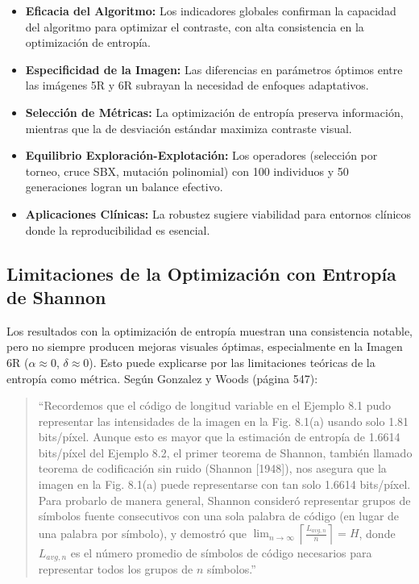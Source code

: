 \begin{itemize}
    \item \textbf{Eficacia del Algoritmo:} Los indicadores globales confirman la capacidad del algoritmo para optimizar el contraste, con alta consistencia en la optimización de entropía.
    \item \textbf{Especificidad de la Imagen:} Las diferencias en parámetros óptimos entre las imágenes 5R y 6R subrayan la necesidad de enfoques adaptativos.
    \item \textbf{Selección de Métricas:} La optimización de entropía preserva información, mientras que la de desviación estándar maximiza contraste visual.
    \item \textbf{Equilibrio Exploración-Explotación:} Los operadores (selección por torneo, cruce SBX, mutación polinomial) con 100 individuos y 50 generaciones logran un balance efectivo.
    \item \textbf{Aplicaciones Clínicas:} La robustez sugiere viabilidad para entornos clínicos donde la reproducibilidad es esencial.
\end{itemize}

\subsection{Limitaciones de la Optimización con Entropía de Shannon}
Los resultados con la optimización de entropía muestran una consistencia notable, pero no siempre producen mejoras visuales óptimas, especialmente en la Imagen 6R (\(\alpha \approx 0\), \(\delta \approx 0\)). Esto puede explicarse por las limitaciones teóricas de la entropía como métrica. Según Gonzalez y Woods (página 547):

\begin{quote}
``Recordemos que el código de longitud variable en el Ejemplo 8.1 pudo representar las intensidades de la imagen en la Fig. 8.1(a) usando solo 1.81 bits/píxel. Aunque esto es mayor que la estimación de entropía de 1.6614 bits/píxel del Ejemplo 8.2, el primer teorema de Shannon, también llamado teorema de codificación sin ruido (Shannon [1948]), nos asegura que la imagen en la Fig. 8.1(a) puede representarse con tan solo 1.6614 bits/píxel. Para probarlo de manera general, Shannon consideró representar grupos de símbolos fuente consecutivos con una sola palabra de código (en lugar de una palabra por símbolo), y demostró que \(\lim_{n \to \infty} \left\lceil \frac{L_{avg,n}}{n} \right\rceil = H\), donde \(L_{avg,n}\) es el número promedio de símbolos de código necesarios para representar todos los grupos de \(n\) símbolos.''
\end{quote}

